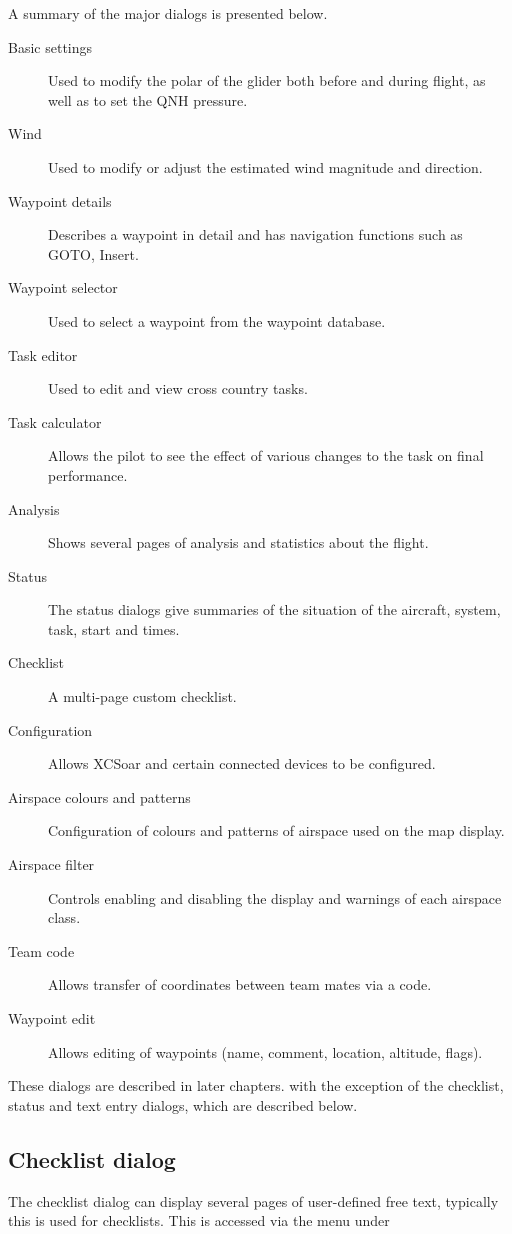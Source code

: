 \documentclass[a4paper,12pt]{refrep}
\begin{document}
A summary of the major dialogs is presented below.
\begin{description}
\item[Basic settings] Used to modify the polar of the glider both
before and during flight, as well as to set the QNH pressure.
\item[Wind]  Used to modify or adjust the estimated wind magnitude and
direction.
\item[Waypoint details] Describes a waypoint in detail
and has navigation functions such as GOTO, Insert.
\item[Waypoint selector] Used to select a waypoint from the waypoint database.
\item[Task editor]  Used to edit and view cross country tasks.
\item[Task calculator] Allows the pilot to see the effect of various
  changes to the task on final performance.
\item[Analysis] Shows several pages of analysis and statistics about the flight.

\item[Status]  The status dialogs give summaries of the situation of the aircraft, system, task, start and times.
\item[Checklist]  A multi-page custom checklist.
\item[Configuration]  Allows XCSoar and certain connected devices to be configured.
\item[Airspace colours and patterns]  Configuration of colours and patterns of airspace used on the map display.
\item[Airspace filter]  Controls enabling and disabling the display and warnings of each airspace class.
\item[Team code] Allows transfer of coordinates between team mates via a 
 code.
\item[Waypoint edit]  Allows editing of waypoints (name, comment, location,
  altitude, flags).
\end{description}

These dialogs are described in later chapters. with the exception of the
checklist, status and text entry dialogs, which are described below.

\subsection*{Checklist dialog}

The checklist dialog can display several pages of user-defined free
text, typically this is used for checklists.  
This is accessed via the menu under 
\begin{quote}
\blink{}
\end{quote}
\end{document}

